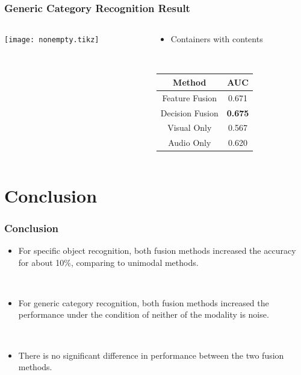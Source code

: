 \documentclass[t]{beamer}
\begin{document}
\begin{frame}
  \frametitle{Generic Category Recognition Result}

  \begin{columns}
    \begin{column}{.6\linewidth}
      \centering
      \footnotesize
      \texttt{[image: nonempty.tikz]}
    \end{column}

    \begin{column}{.4\linewidth}
      \vspace{-1.4\linewidth}
      \begin{itemize}
        \item Containers with contents
      \end{itemize}
      ~

      \begin{tabular}[h]{c|c}
        \hline
        Method & AUC \\ \hline \hline
        Feature Fusion & 0.671 \\ \hline
        Decision Fusion  & \textbf{0.675} \\ \hline
        Visual Only & 0.567 \\ \hline
        Audio Only & 0.620 \\ \hline
      \end{tabular}
    \end{column}
  \end{columns}
\end{frame}

\section{Conclusion}
\begin{frame}
  \frametitle{Conclusion}

  \begin{itemize}
    \item For specific object recognition, both fusion methods increased the accuracy for about 10\%, comparing to unimodal methods.

      ~
    \item For generic category recognition, both fusion methods increased the performance under the condition of neither of the modality is noise.

      ~
    \item There is no significant difference in performance between the two fusion methods.
  \end{itemize}
\end{frame}
\end{document}
